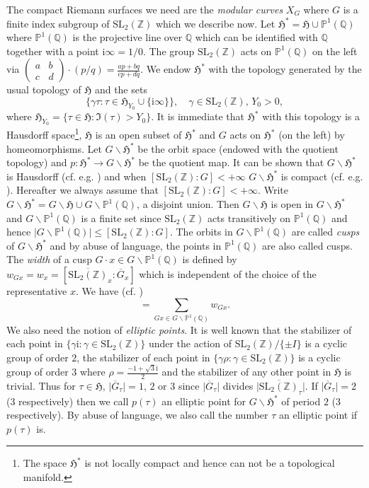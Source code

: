 \documentclass[12pt]{amsart}
\numberwithin{equation}{section}
\theoremstyle{plain}
\theoremstyle{definition}
\theoremstyle{remark}
\newcommand\rmi{\mathrm{i}}
\newcommand\tbtmat[4]{\left(\begin{smallmatrix}{#1} & {#2} \\ {#3} & {#4}\end{smallmatrix}\right)}
\newcommand*\abs[1]{\lvert#1\rvert}
\newcommand\numQ{\mathbb{Q}}
\newcommand\projQ{\mathbb{P}^1(\mathbb{Q})}
\newcommand\slZ{\mathrm{SL}_2(\mathbb{Z})}
\newcommand\uhp{\mathfrak{H}}
\begin{document}
The compact Riemann surfaces we need are the \emph{modular curves} $X_G$ where $G$ is a finite index subgroup of $\slZ$ which we describe now. Let $\uhp^{*}=\uhp\cup\projQ$ where $\projQ$ is the projective line over $\numQ$ which can be identified with $\numQ$ together with a point $\rmi\infty=1/0$. The group $\slZ$ acts on $\projQ$ on the left via $\tbtmat{a}{b}{c}{d}\cdot(p/q)=\frac{ap+bq}{cp+dq}$. We endow $\uhp^{*}$ with the topology generated by the usual topology of $\uhp$ and the sets
\begin{equation*}
\{\gamma\tau\colon \tau\in\uhp_{Y_0}\cup\{\rmi\infty\}\},\quad\gamma\in\slZ,\,Y_0>0,
\end{equation*}
where $\uhp_{Y_0}=\{\tau\in\uhp\colon\Im(\tau)>Y_0\}$. It is immediate that $\uhp^{*}$ with this topology is a Hausdorff space\footnote{The space $\uhp^{*}$ is not locally compact and hence can not be a topological manifold.}, $\uhp$ is an open subset of $\uhp^{*}$ and $G$ acts on $\uhp^{*}$ (on the left) by homeomorphisms. Let $G\backslash\uhp^{*}$ be the orbit space (endowed with the quotient topology) and $p\colon\uhp^{*}\rightarrow G\backslash\uhp^{*}$ be the quotient map. It can be shown that $G\backslash\uhp^{*}$ is Hausdorff (cf. e.g. \cite[Lemma 1.7.7]{Miy06}) and when $[\slZ\colon G]<+\infty$ $G\backslash\uhp^{*}$ is compact (cf. e.g. \cite[Proposition 14.6, Chapter IV]{Fri11}). Hereafter we always assume that $[\slZ\colon G]<+\infty$. Write $G\backslash\uhp^{*}=G\backslash\uhp\cup G\backslash\projQ$, a disjoint union. Then $G\backslash\uhp$ is open in $G\backslash\uhp^{*}$ and $G\backslash\projQ$ is a finite set since $\slZ$ acts transitively on $\projQ$ and hence $\abs{G\backslash\projQ}\leq[\slZ\colon G]$. 
The orbits in $G\backslash\projQ$ are called \emph{cusps} of $G\backslash\uhp^{*}$ and by abuse of language, the points in $\projQ$ are also called cusps. The \emph{width} of a cusp $G\cdot x\in G\backslash\projQ$ is defined by $w_{Gx}=w_x=[\overline{\slZ}_{x}\colon\overline{G}_x]$ which is independent of the choice of the representative $x$. We have (cf. \cite[Proposition 6.3.8(b)]{CS17})
\begin{equation*}
[\overline{\slZ}\colon\overline{G}]=\sum_{Gx\in G\backslash\projQ}w_{Gx}.
\end{equation*}
We also need the notion of \emph{elliptic points}. It is well known that the stabilizer of each point in $\{\gamma\rmi\colon\gamma\in\slZ\}$ under the action of $\slZ/\{\pm I\}$ is a cyclic group of order $2$, the stabilizer of each point in $\{\gamma\rho\colon\gamma\in\slZ\}$ is a cyclic group of order $3$ where $\rho=\frac{-1+\sqrt{3}\rmi}{2}$ and the stabilizer of any other point in $\uhp$ is trivial. Thus for $\tau\in\uhp$, $\abs{\overline{G}_\tau}=1$, $2$ or $3$ since $\abs{\overline{G}_\tau}$ divides $\abs{\overline{\slZ}_\tau}$. If $\abs{\overline{G}_\tau}=2$ ($3$ respectively) then we call $p(\tau)$ an elliptic point for $G\backslash\uhp^{*}$ of period $2$ ($3$ respectively). By abuse of language, we also call the number $\tau$ an elliptic point if $p(\tau)$ is.
\end{document}

